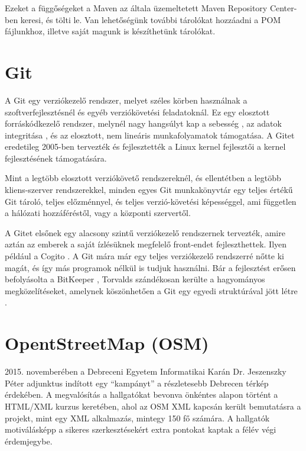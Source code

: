 \documentclass[a4paper,12pt]{report}
\begin{document}
\vspace{2mm}
Ezeket a függőségeket a Maven az általa üzemeltetett Maven Repository Center-ben \cite{mavenrepository} keresi, és tölti le. Van lehetőségünk további tárolókat hozzáadni a POM fájlunkhoz, illetve saját magunk is készíthetünk tárolókat.

\newpage
\section{Git}
\label{git}

A Git egy verziókezelő rendszer, melyet széles körben használnak a szoftverfejlesztésnél és egyéb verziókövetési feladatoknál. Ez egy elosztott forráskódkezelő rendszer, melynél nagy hangsúlyt kap a sebesség \cite{gitspeed}, az adatok integritása \cite{gitdata}, és az elosztott, nem lineáris munkafolyamatok támogatása. A Gitet eredetileg 2005-ben tervezték és fejlesztették a Linux kernel fejlesztői a kernel fejlesztésének támogatására.

\vspace{2mm}
Mint a legtöbb elosztott verziókövető rendszereknél, és ellentétben a legtöbb kliens-szerver rendszerekkel, minden egyes Git munkakönyvtár egy teljes értékű Git tároló, teljes előzménnyel, és teljes verzió-követési képességgel, ami független a hálózati hozzáféréstől, vagy a központi szervertől.

\vspace{2mm}
A Gitet elsőnek egy alacsony szintű verziókezelő rendszernek tervezték, amire aztán az emberek a saját ízlésüknek megfelelő front-endet fejleszthettek. Ilyen például a Cogito \cite{cogito}. A Git mára már egy teljes verziókezelő rendszerré nőtte ki magát, és így más programok nélkül is tudjuk használni. Bár a fejlesztést erősen befolyásolta a BitKeeper \cite{bitkeeper}, Torvalds szándékosan kerülte a hagyományos megközelítéseket, amelynek köszönhetően a Git egy egyedi struktúrával jött létre \cite{gitunique}.

\newpage
\section{OpentStreetMap (OSM)}
\label{osm}

\vspace{2mm}
2015. novemberében a Debreceni Egyetem Informatikai Karán Dr. Jeszenszky Péter adjunktus indított egy ``kampányt'' a részletesebb Debrecen térkép érdekében. A megvalósítás a hallgatókat bevonva önkéntes alapon történt a HTML/XML kurzus keretében, ahol az OSM XML kapcsán került bemutatásra a projekt, mint egy XML alkalmazás, mintegy 150 fő számára. A hallgatók motiválásképp a sikeres szerkesztésekért extra pontokat kaptak a félév végi érdemjegybe.
\end{document}
